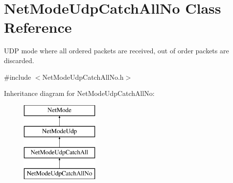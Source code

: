 \hypertarget{class_net_mode_udp_catch_all_no}{
\section{NetModeUdpCatchAllNo Class Reference}
\label{class_net_mode_udp_catch_all_no}
}


UDP mode where all ordered packets are received, out of order packets are discarded.  




{\ttfamily \#include $<$NetModeUdpCatchAllNo.h$>$}

Inheritance diagram for NetModeUdpCatchAllNo:\begin{figure}[H]
\begin{center}
\leavevmode
\includegraphics[height=4.000000cm]{class_net_mode_udp_catch_all_no}
\end{center}
\end{figure}
